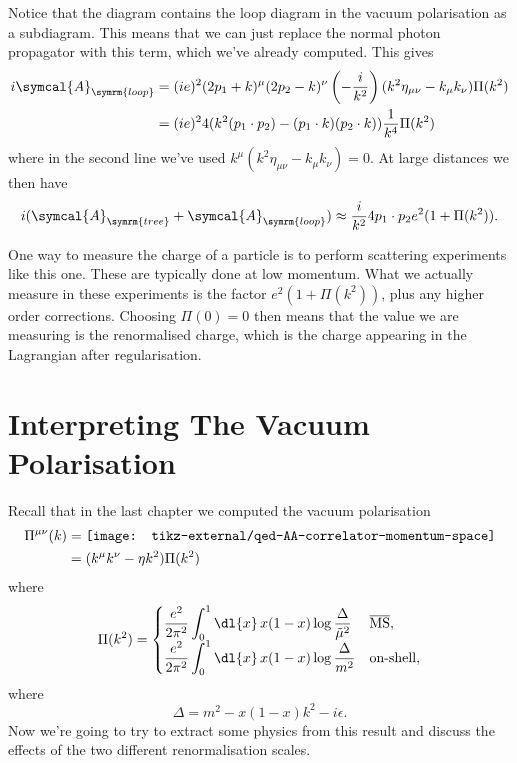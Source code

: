 \documentclass[fleqn]{NotesClass}
\newcommand{\MSbar}{\ensuremath{\overline{\text{MS}}}}
\newcommand{\amplitude}{\symcal{A}}
\newcommand{\minkowskiMetric}{\eta}
\begin{document}
    Notice that the diagram contains the loop diagram in the vacuum polarisation as a subdiagram.
    This means that we can just replace the normal photon propagator with this term, which we've already computed.
    This gives
    \begin{align}
        i\amplitude_{\symrm{loop}} &= (ie)^2(2p_1 + k)^\mu(2p_2 - k)^\nu \left( -\frac{i}{k^2} \right)(k^2\minkowskiMetric_{\mu\nu} - k_\mu k_\nu)\Pi(k^2)\\
        &= (ie)^24(k^2 (p_1 \cdot p_2) - (p_1 \cdot k)(p_2 \cdot k)) \frac{1}{k^4}\Pi(k^2)
    \end{align}
    where in the second line we've used \(k^\mu(k^2\minkowskiMetric_{\mu\nu} - k_\mu k_\nu) = 0\).
    At large distances we then have
    \begin{equation}
        \label{eqn:vacuum-polarisation-2-to-2-scattering}
        i(\amplitude_{\symrm{tree}} + \amplitude_{\symrm{loop}}) \approx \frac{i}{k^2}4 p_1 \cdot p_2 e^2 (1 + \Pi(k^2)).
    \end{equation}
    
    One way to measure the charge of a particle is to perform scattering experiments like this one.
    These are typically done at low momentum.
    What we actually measure in these experiments is the factor \(e^2(1 + \Pi(k^2))\), plus any higher order corrections.
    Choosing \(\Pi(0) = 0\) then means that the value we are measuring is the renormalised charge, which is the charge appearing in the Lagrangian after regularisation.
    
    \chapter{Interpreting The Vacuum Polarisation}
    Recall that in the last chapter we computed the vacuum polarisation
    \begin{align}
        \Pi^{\mu\nu}(k) &= \vcenter{\hbox{\texttt{[image: tikz-external/qed-AA-correlator-momentum-space]}}}\\
        &= (k^\mu k^\nu - \minkowskiMetric k^2)\Pi(k^2)
    \end{align}
    where
    \begin{equation}
        \Pi(k^2) =
        \begin{cases}
            \displaystyle \frac{e^2}{2\pi^2} \int_0^1 \dl{x} \, x(1 - x) \log \frac{\Delta}{\tilde{\mu}^2} & \MSbar,\\
            \displaystyle \frac{e^2}{2\pi^2} \int_0^1 \dl{x} \, x(1 - x) \log \frac{\Delta}{m^2} & \text{on-shell},
        \end{cases}
    \end{equation}
    where
    \begin{equation}
        \Delta = m^2 - x(1 - x)k^2 - i\epsilon.
    \end{equation}
    Now we're going to try to extract some physics from this result and discuss the effects of the two different renormalisation scales.
    
\end{document}
